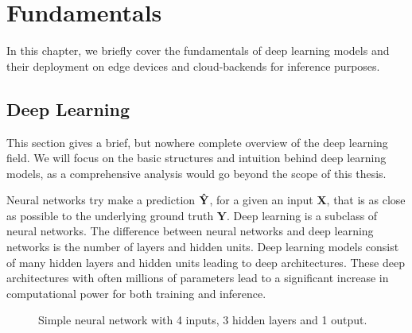 \chapter{Fundamentals}
\label{chap:fundamentels}
In this chapter, we briefly cover the fundamentals of deep learning models and their deployment on edge devices and cloud-backends for inference purposes.



\section{Deep Learning}
This section gives a brief, but nowhere complete overview of the deep learning field. We will focus on the basic structures and intuition behind deep learning models, as a comprehensive analysis would go beyond the scope of this thesis.

Neural networks try make a prediction $\mathbf{\Hat{Y}}$, for a  given an input $\mathbf{X}$, that is as close as possible to the underlying ground truth $\mathbf{Y}$. 
Deep learning is a subclass of neural networks.
The difference between neural networks and deep learning networks is the number of layers and hidden units. Deep learning models consist of many hidden layers and hidden units leading to deep architectures.
These deep architectures with often millions of parameters lead to a significant increase in computational power for both training and inference.
\begin{figure}[!htb]
    \centering
    \resizebox{.8\linewidth}{!}{}
    \caption{Simple neural network with 4 inputs, 3 hidden layers and 1 output.}
    \label{fig:simpleNN}
\end{figure}


